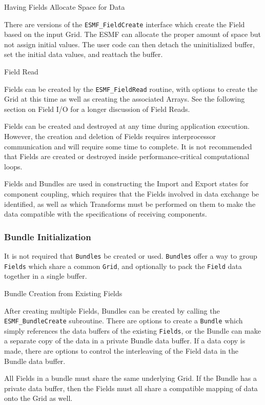 \begin{description}
\item{Having Fields Allocate Space for Data}

There are versions of the {\tt ESMF\_FieldCreate} interface
which create the Field based on the input Grid.  The ESMF
can allocate the proper amount of 
space but not assign initial values.  The user code
can then detach the uninitialized buffer, set the
initial data values, and reattach the buffer.

\item{Field Read}

Fields can be created by the {\tt ESMF\_FieldRead}
routine, with options to create the Grid at this time
as well as creating the associated Arrays.
See the following section on Field I/O for a longer
discussion of Field Reads.

\end{description}

Fields can be created and destroyed
at any time during application execution.  However, the creation
and deletion of Fields requires interprocessor communication
and will require some time to complete.  It is not recommended
that Fields are created or destroyed
inside performance-critical computational loops.

Fields and Bundles are used in constructing 
the Import and Export states for component coupling, 
which requires that the 
Fields involved in data exchange be identified, as well as
which Transforms must be performed on them to make the
data compatible with the specifications of
receiving components.  

\subsubsection{Bundle Initialization}

It is not required that {\tt Bundles} be created or used.
{\tt Bundles} offer a way to group {\tt Fields} which share a
common {\tt Grid}, and optionally to pack the {\tt Field} data
together in a single buffer.

\begin{description}

\item{Bundle Creation from Existing Fields}

After creating multiple Fields, Bundles can be created
by calling the {\tt ESMF\_BundleCreate} subroutine.  There are
options to create a {\tt Bundle} which simply references
the data buffers of the existing {\tt Fields}, 
or the Bundle can make a separate copy of the data in a private 
Bundle data buffer.  If a data copy is made, there are options to
control the interleaving of the Field data in the Bundle data buffer.

All Fields in a bundle must share the same underlying Grid.
If the Bundle has a private data buffer, then the Fields must
all share a compatible mapping of data onto the Grid as well.

\end{description}

